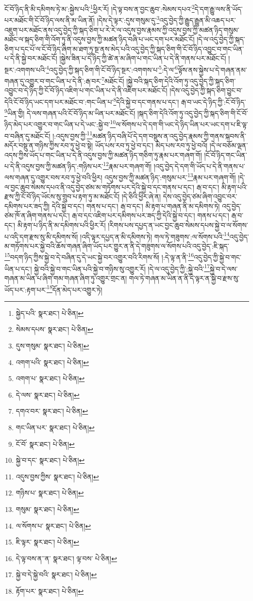 ངོ་བོ་ཉིད་ནི་མི་དམིགས་ཏེ་མ་:སྐྱེས་པའི་\footnote{སྐྱེད་པའི་  སྣར་ཐང་།  པེ་ཅིན། }ཕྱིར་རོ། །དེ་ལྟ་བས་ན་བྱང་ཆུབ་:སེམས་དཔའ་\footnote{སེམས་དཔས་  སྣར་ཐང་།  པེ་ཅིན། }དེ་དག་རྒྱུ་ལས་ནི་ཡོད་པར་མཐོང་གི་ངོ་བོ་ཉིད་ལས་ནི་མ་ཡིན་ནོ། །དེས་དེ་ལྟར་:དུས་གསུམ་དུ་\footnote{དུས་གསུམ་  སྣར་ཐང་།  པེ་ཅིན། }འདུ་བྱེད་ཀྱི་རྒྱུད་རྒྱུན་མི་འཆད་པར་འཇུག་པར་མཐོང་ནས་འདུ་བྱེད་ཀྱི་སྐད་ཅིག་པ་རེ་རེ་ལ་འདུས་བྱས་རྣམས་ཀྱི་འདུས་བྱས་ཀྱི་མཚན་ཉིད་གསུམ་མཐོང་ལ་སྐད་ཅིག་གི་འོག་ཏུ་ནི་འདུས་བྱས་ཀྱི་མཚན་ཉིད་བཞི་པ་ཡང་དག་པར་མཐོང་ངོ། །དེ་ལ་འདུ་བྱེད་ཀྱི་སྐད་ཅིག་པ་དང་པོ་ལ་ངོ་བོ་ཉིད་ཞིག་མ་ཐག་ཏུ་སྔ་ནས་མེད་པའི་འདུ་བྱེད་ཀྱི་སྐད་ཅིག་གི་ངོ་བོ་ཉིད་འབྱུང་བ་གང་ཡིན་པ་དེ་ནི་སྐྱེ་བར་མཐོང་ངོ། །སྐྱེས་ཟིན་པ་དེ་ཉིད་ཀྱི་ཚེ་ན་མ་ཞིག་པ་གང་ཡིན་པ་དེ་ནི་གནས་པར་མཐོང་ངོ། །སྔར་:འགགས་པའི་\footnote{འགག་པའི་  སྣར་ཐང་།  པེ་ཅིན། }འདུ་བྱེད་ཀྱི་སྐད་ཅིག་གི་ངོ་བོ་ཉིད་སྔར་:འགགས་པ་\footnote{འགག་པ་  སྣར་ཐང་།  པེ་ཅིན། }:དེ་ལ་\footnote{དེ་ལས་  སྣར་ཐང་།  པེ་ཅིན། }ལྟོས་ནས་སྐྱེས་པ་དེ་གཞན་ནམ་གཞན་དུ་འགྱུར་བ་གང་ཡིན་པ་དེ་ནི་:རྒ་བར་\footnote{དགའ་བར་  སྣར་ཐང་།  པེ་ཅིན། }མཐོང་ངོ། །སྐྱེ་བའི་སྐད་ཅིག་དེའི་འོག་ཏུ་འདུ་བྱེད་ཀྱི་སྐད་ཅིག་འབྱུང་བ་དེ་ཉིད་ཀྱི་ངོ་བོ་ཉིད་འཇིག་པ་གང་ཡིན་པ་དེ་ནི་འཇིག་པར་མཐོང་ངོ། །དེས་འདུ་བྱེད་ཀྱི་སྐད་ཅིག་བྱུང་བ་དེའི་ངོ་བོ་ཉིད་ཡང་དག་པར་མཐོང་བ་:གང་ཡིན་པ་\footnote{གང་ཡིན་པར་  སྣར་ཐང་།  པེ་ཅིན། }དེའི་སྐྱེ་བ་དང་གནས་པ་དང་། རྒ་བ་ཡང་དེ་ཉིད་ཀྱི་:ངོ་བོ་ཉིད་\footnote{ངོ་བོ་  སྣར་ཐང་།  པེ་ཅིན། }ཡིན་གྱི། དེ་ལས་གཞན་པའི་ངོ་བོ་ཉིད་མ་ཡིན་པར་མཐོང་ངོ། །སྐད་ཅིག་དེའི་འོག་ཏུ་འདུ་བྱེད་ཀྱི་སྐད་ཅིག་གི་ངོ་བོ་ཉིད་མེད་པར་འགྱུར་བ་གང་ཡིན་པ་དེ་ཡང་:སྐྱེ་བ་\footnote{སྐྱེ་བ་དང་  སྣར་ཐང་།  པེ་ཅིན། }ལ་སོགས་པ་དེ་དག་གི་ཡང་དེ་ཉིད་ཡིན་པར་ཡང་དག་པ་ཇི་ལྟ་བ་བཞིན་དུ་མཐོང་ངོ། །:འདུས་བྱས་ཀྱི་\footnote{འདུས་བྱས་ཀྱིས་  སྣར་ཐང་།  པེ་ཅིན། }མཚན་ཉིད་བཞི་པོ་དེ་དག་བསྡུས་ན་འདུ་བྱེད་རྣམས་ཀྱི་གནས་སྐབས་ནི་མདོར་བསྡུ་ན་གཉིས་ཀྱིས་རབ་ཏུ་ཕྱེ་བ་སྟེ། ཡོད་པས་རབ་ཏུ་ཕྱེ་བ་དང་། མེད་པས་རབ་ཏུ་ཕྱེ་བའོ། །དེ་ལ་བཅོམ་ལྡན་འདས་ཀྱིས་ཡོད་པ་གང་ཡིན་པ་དེ་ནི་འདུས་བྱས་ཀྱི་མཚན་ཉིད་གཅིག་ཏུ་རྣམ་པར་གཞག་གོ། །ངོ་བོ་ཉིད་གང་ཡིན་པ་དེ་ནི་འདུས་བྱས་ཀྱི་མཚན་ཉིད་:གཉིས་པར་\footnote{གཉིས་པ་  སྣར་ཐང་།  པེ་ཅིན། }རྣམ་པར་གཞག་གོ། །འདུ་བྱེད་དེ་དག་གི་ཡོད་པ་དེ་ནི་གནས་པ་ལས་གཞན་དུ་འགྱུར་བས་རབ་ཏུ་ཕྱེ་བའི་ཕྱིར། འདུས་བྱས་ཀྱི་མཚན་ཉིད་:གསུམ་པར་\footnote{གསུམ་  སྣར་ཐང་།  པེ་ཅིན། }རྣམ་པར་གཞག་གོ། །དེ་ལ་བྱང་ཆུབ་སེམས་དཔའ་ནི་འདུ་བྱེད་ཙམ་མ་གཏོགས་པར་དེའི་སྐྱེ་བ་དང་གནས་པ་དང་། རྒ་བ་དང་། མི་རྟག་པའི་རྫས་ཀྱི་ངོ་བོ་ཉིད་ཡོངས་སུ་གྲུབ་པ་རྟག་ཏུ་མ་མཐོང་ངོ། །དེ་ཅིའི་ཕྱིར་ཞེ་ན། དེས་འདུ་བྱེད་ཙམ་ཞིག་འབྱུང་བར་དམིགས་པར་ཟད་ཀྱི། དེའི་སྐྱེ་བ་དང་། གནས་པ་དང་། རྒ་བ་དང་། མི་རྟག་པ་གཞན་ནི་མ་དམིགས་ཏེ། འདུ་བྱེད་ཙམ་ཁོ་ན་ཞིག་གནས་པ་དང་། རྒ་བ་དང་འཇིག་པར་དམིགས་པར་ཟད་ཀྱི་དེའི་སྐྱེ་བ་དང་། གནས་པ་དང་། རྒ་བ་དང་། མི་རྟག་པ་ཉིད་ནི་མ་དམིགས་པའི་ཕྱིར་རོ། །རིགས་པས་དཔྱད་ན་ཡང་བྱང་ཆུབ་སེམས་དཔས་སྐྱེ་བ་ལ་སོགས་པ་འདི་དག་རྫས་སུ་མི་དམིགས་སོ། །འདི་ལྟར་དཔྱད་ན་མི་དམིགས་ཏེ། གལ་ཏེ་གཟུགས་:ལ་སོགས་པའི་\footnote{ལ་སོགས་པ་  སྣར་ཐང་།  པེ་ཅིན། }འདུ་བྱེད་མ་གཏོགས་པར་སྐྱེ་བའི་ཆོས་གཞན་ཞིག་ཡོད་པར་གྱུར་ན་ནི་དེ་གཟུགས་ལ་སོགས་པའི་འདུ་བྱེད་:ཇི་སྐད་\footnote{ཇི་ལྟར་  སྣར་ཐང་།  པེ་ཅིན། }བདག་ཉིད་ཀྱིས་སྐྱེ་བ་དེ་བཞིན་དུ་དེ་ཡང་སྐྱེ་བར་འགྱུར་བའི་རིགས་སོ། །:དེ་ལྟ་ན་ནི་\footnote{དེ་ལྟ་བས་ན་་ན་  སྣར་ཐང་། ལྟ་བས་  པེ་ཅིན། }འདུ་བྱེད་ཀྱི་སྐྱེ་བ་གང་ཡིན་པ་དང་། སྐྱེ་བའི་སྐྱེ་བ་གང་ཡིན་པའི་སྐྱེ་བ་གཉིས་སུ་འགྱུར་རོ། །དེ་ལ་འདུ་བྱེད་ཀྱི་:སྐྱེ་བའི་\footnote{སྐྱེ་བ་དེ་སྐྱེ་བའི་  སྣར་ཐང་།  པེ་ཅིན། }སྐྱེ་བ་དེ་ལས་གཞན་མ་ཡིན་པ་ཞིག་གམ་གཞན་ཞིག་ཏུ་འགྱུར་གྲང་ན། གལ་ཏེ་གཞན་མ་ཡིན་ན་ནི་དེ་ལྟར་ན་སྐྱེ་བ་རྫས་སུ་ཡོད་པར་:རྟག་པར་\footnote{རྟོག་པར་  སྣར་ཐང་།  པེ་ཅིན། }དོན་མེད་པར་འགྱུར་ཏེ། 